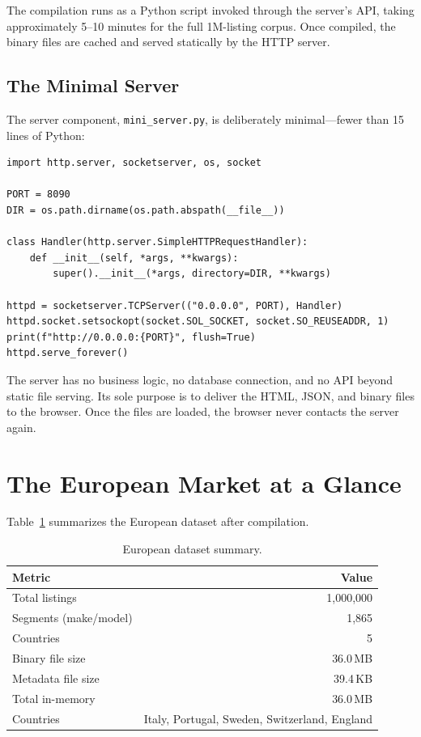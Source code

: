 \documentclass[11pt,a4paper,twoside]{book}
\begin{document}
The compilation runs as a Python script invoked through the server's API, taking approximately
5--10 minutes for the full 1M-listing corpus. Once compiled, the binary files are cached and
served statically by the HTTP server.

\subsection{The Minimal Server}

The server component, \texttt{mini\_server.py}, is deliberately minimal---fewer than 15 lines
of Python:

\begin{lstlisting}[style=pseudo,caption={The minimal HTTP server (mini\_server.py).}]
import http.server, socketserver, os, socket

PORT = 8090
DIR = os.path.dirname(os.path.abspath(__file__))

class Handler(http.server.SimpleHTTPRequestHandler):
    def __init__(self, *args, **kwargs):
        super().__init__(*args, directory=DIR, **kwargs)

httpd = socketserver.TCPServer(("0.0.0.0", PORT), Handler)
httpd.socket.setsockopt(socket.SOL_SOCKET, socket.SO_REUSEADDR, 1)
print(f"http://0.0.0.0:{PORT}", flush=True)
httpd.serve_forever()
\end{lstlisting}

The server has no business logic, no database connection, and no API beyond static file
serving. Its sole purpose is to deliver the HTML, JSON, and binary files to the browser.
Once the files are loaded, the browser never contacts the server again.

\section{The European Market at a Glance}

Table~\ref{tab:europe} summarizes the European dataset after compilation.

\begin{table}[H]
\centering
\caption{European dataset summary.}
\label{tab:europe}
\begin{tabular}{@{}lr@{}}
\toprule
\textbf{Metric} & \textbf{Value} \\
\midrule
Total listings       & 1,000,000 \\
Segments (make/model) & 1,865 \\
Countries            & 5 \\
Binary file size     & 36.0\,MB \\
Metadata file size   & 39.4\,KB \\
Total in-memory      & 36.0\,MB \\
\midrule
Countries            & Italy, Portugal, Sweden, Switzerland, England \\
\bottomrule
\end{tabular}
\end{table}
\end{document}

